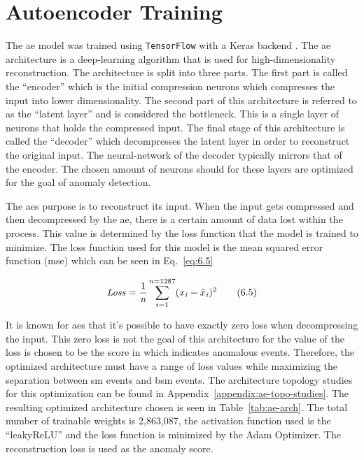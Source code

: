 \section{Autoencoder Training}\label{sec:ae-training}

The \gls{ae} model was trained using \texttt{TensorFlow} \cite{tensorflow} with a Keras backend \cite{keras}. The \gls{ae} architecture is a deep-learning algorithm that is used
for high-dimensionality reconstruction. The architecture is split into three parts. The first part is called the ``encoder'' which is the initial compression neurons which compresses 
the input into lower dimensionality. The second part of this architecture is referred to as the ``latent layer'' and is considered the bottleneck. This is a single layer of neurons
that holds the compressed input. The final stage of this architecture is called the ``decoder'' which decompresses the latent layer in order to reconstruct the original input. The 
neural-network of the decoder typically mirrors that of the encoder. The chosen amount of neurons should for these layers are optimized for the goal of anomaly detection.
\par
The \gls{ae}s purpose is to reconstruct its input. When the input gets compressed and then decompressed by the \gls{ae}, there is a certain amount of data lost within the process. 
This value is determined by the loss function that the model is trained to minimize. The loss function used for this model is the mean squared error function (\gls{mse}) which can be 
seen in Eq.~\ref{eq:6.5}

\begin{equation}\label{eq:6.5}
    \textrm{\textit{Loss}} = \frac{1}{\textrm{\textit{n}}} \sum_{i=1}^{n=1287} (\textrm{\textit{x}}_{\textrm{\textit{i}}}-\hat{x}_{\textrm{\textit{i}}})^{\textrm{2}}
\tag{6.5}
\end{equation}

It is known for \gls{ae}s that it's possible to have exactly zero loss when decompressing the input. This zero loss is not the goal of this architecture for the value of the loss is chosen to be the score in 
which indicates anomalous events. Therefore, the optimized architecture must have a range of loss values while maximizing the separation between \gls{sm} events and \gls{bsm} events.  The architecture topology 
studies for this optimization can be found in Appendix~\ref{appendix:ae-topo-studies}. The resulting optimized architecture chosen is seen in Table~\ref{tab:ae-arch}. The total number of trainable weights is 2,863,087,
the activation function used is the ``leakyReLU'' and the loss function is minimized by the Adam Optimizer. The reconstruction loss is used as the anomaly score. 

